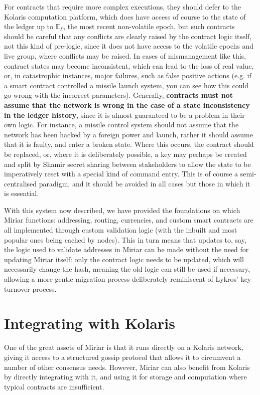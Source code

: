 \documentclass{extreport}
\begin{document}
For contracts that require more complex executions, they should defer to the Kolaris computation platform, which does have access of course to the state of the ledger up to \(\mathbb{E}_\Gamma\), the most recent non-volatile epoch, but such contracts should be careful that any conflicts are clearly raised by the contract logic itself, not this kind of pre-logic, since it does not have access to the volatile epochs and live group, where conflicts may be raised. In cases of mismanagement like this, contract states may become inconsistent, which can lead to the loss of real value, or, in catastrophic instances, major failures, such as false positive actions (e.g. if a smart contract controlled a missile launch system, you can see how this could go wrong with the incorrect parameters). Generally, \textbf{contracts must not assume that the network is wrong in the case of a state inconsistency in the ledger history}, since it is almost guaranteed to be a problem in their own logic. For instance, a missile control system should not assume that the network has been hacked by a foreign power and launch, rather it should assume that it is faulty, and enter a broken state. Where this occurs, the contract should be replaced, or, where it is deliberately possible, a key may perhaps be created and split by Shamir secret sharing between stakeholders to allow the state to be imperatively reset with a special kind of command entry. This is of course a semi-centralised paradigm, and it should be avoided in all cases but those in which it is essential.

With this system now described, we have provided the foundations on which Miriar functions: addressing, routing, currencies, and custom smart contracts are all implemented through custom validation logic (with the inbuilt and most popular ones being cached by nodes). This in turn means that updates to, say, the logic used to validate addresses in Miriar can be made without the need for updating Miriar itself: only the contract logic needs to be updated, which will necessarily change the hash, meaning the old logic can still be used if necessary, allowing a more gentle migration process deliberately reminiscent of Lykros' key turnover process.

\section{Integrating with Kolaris}

One of the great assets of Miriar is that it runs directly on a Kolaris network, giving it access to a structured gossip protocol that allows it to circumvent a number of other consensus needs. However, Miriar can also benefit from Kolaris by directly integrating with it, and using it for storage and computation where typical contracts are insufficient.
\end{document}
